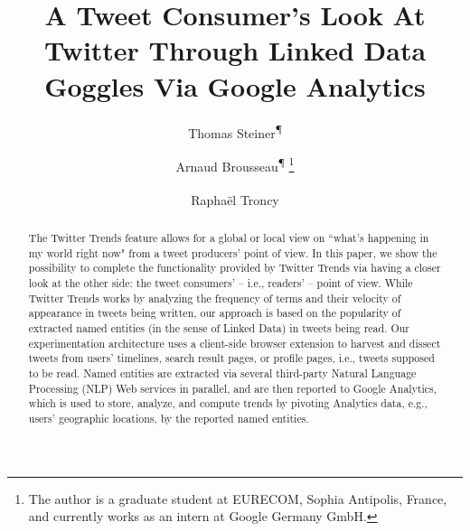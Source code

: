 \documentclass[runningheads,a4paper]{llncs}
\begin{document}
\mainmatter  %

\title{A Tweet Consumer's Look At Twitter Through Linked Data Goggles Via Google Analytics}


%
%
\author{Thomas Steiner\textsuperscript{\P} \and Arnaud Brousseau\textsuperscript{\P\dag}%
\thanks{The author is a graduate student at EURECOM, Sophia Antipolis, France, and currently works as an intern at Google Germany GmbH.}%
\and Rapha\"{e}l Troncy\textsuperscript{\dag}}

%
%


\maketitle

\begin{abstract}
The Twitter Trends feature allows for a global or local view on ``what's happening in my world right now" from a tweet producers' point of view. In this paper, we show the possibility to complete the functionality provided by Twitter Trends via having a closer look at the other side: the tweet consumers' -- i.e., readers' -- point of view. While Twitter Trends works by analyzing the frequency of terms and their velocity of appearance in tweets being written, our approach is based on the popularity of extracted named entities (in the sense of Linked Data) in tweets being read. Our experimentation architecture uses a client-side browser extension to harvest and dissect tweets from users' timelines, search result pages, or profile pages, i.e., tweets supposed to be read. Named entities are extracted via several third-party Natural Language Processing (NLP) Web services in parallel, and are then reported to Google Analytics, which is used to store, analyze, and compute trends by pivoting Analytics data, e.g., users' geographic locations, by the reported named entities.
\end{abstract}
\end{document}
